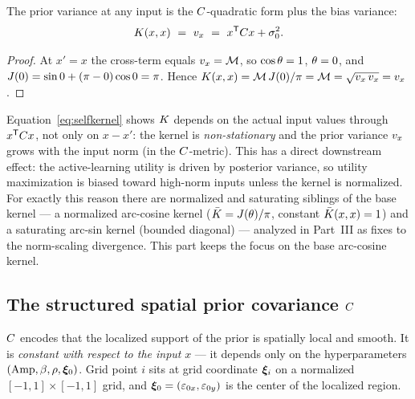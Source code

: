 \begin{proposition}
The prior variance at any input is the $C$-quadratic form plus the bias
variance:
\begin{equation}
\Kf(x,x)\ =\ \vmag_x\ =\ x\transpose\Cmat x+\sigz^2.
\label{eq:selfkernel}
\end{equation}
\end{proposition}

\begin{proof}
At $x'=x$ the cross-term equals $v_x=\mathcal{M}$, so $\cos\theta=1$, $\theta=0$, and
$J(0)=\sin0+(\pi-0)\cos0=\pi$. Hence
$K(x,x)=\mathcal{M}\,J(0)/\pi=\mathcal{M}=\sqrt{v_x\,v_x}=v_x$.
\end{proof}

\begin{remark}
Equation~\eqref{eq:selfkernel} shows $K$ depends on the actual input values
through $x^{\mathsf{T}}C x$, not only on $x-x'$: the kernel is \emph{non-stationary}
and the prior variance $v_x$ grows with the input norm (in the $C$-metric).
This has a direct downstream effect: the active-learning utility is driven by
posterior variance, so utility maximization is biased toward high-norm inputs
unless the kernel is normalized. For exactly this reason there are normalized and
saturating siblings of the base kernel --- a normalized arc-cosine kernel
($\bar{K}=J(\theta)/\pi$, constant $\bar{K}(x,x)=1$) and a saturating
arc-sin kernel (bounded diagonal) --- analyzed in Part~III as fixes to the
norm-scaling divergence. This part keeps the focus on the base arc-cosine kernel.
\end{remark}

\subsection{The structured spatial prior covariance $C$}
\label{subsec:Cprior}

$C$ encodes that the localized support of the prior is spatially local and
smooth. It is \emph{constant with respect to the input} $x$ --- it depends only on
the hyperparameters $(\mathrm{Amp},\beta,\rho,\bm{\xi}_{0})$. Grid point $i$ sits at grid
coordinate $\bm{\xi}_i$ on a normalized $[-1,1]\times[-1,1]$ grid, and
$\bm{\xi}_{0}=(\varepsilon_{0x},\varepsilon_{0y})$ is the center of the localized region.

